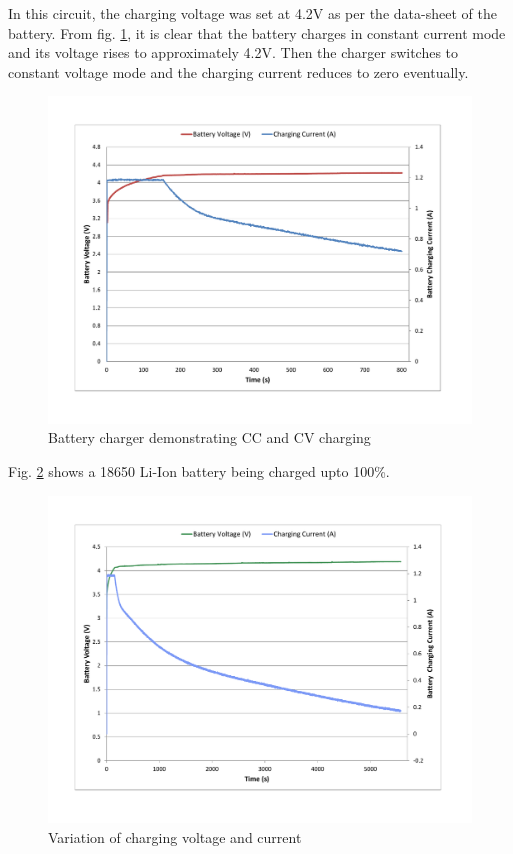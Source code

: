 In this circuit, the charging voltage was set at 4.2V as per the data-sheet of the battery. From fig. \ref{fig:cccv}, it is clear that the battery charges in constant current mode and its voltage rises to approximately 4.2V. Then the charger switches to constant voltage mode and the charging current reduces to zero eventually.
\begin{figure}[H]
	\centering
	\includegraphics[width=\columnwidth]{IMGS/Battery CC CV.pdf}
	\caption{Battery charger demonstrating CC and CV charging}
	\label{fig:cccv}
\end{figure}
Fig. \ref{fig:chargin'} shows a 18650 Li-Ion battery being charged upto 100\%.
\begin{figure}[H]
	\centering
	\includegraphics[width=\columnwidth]{IMGS/Battery Charge Cycle.pdf}
	\caption{Variation of charging voltage and current}
	\label{fig:chargin'}
\end{figure}
